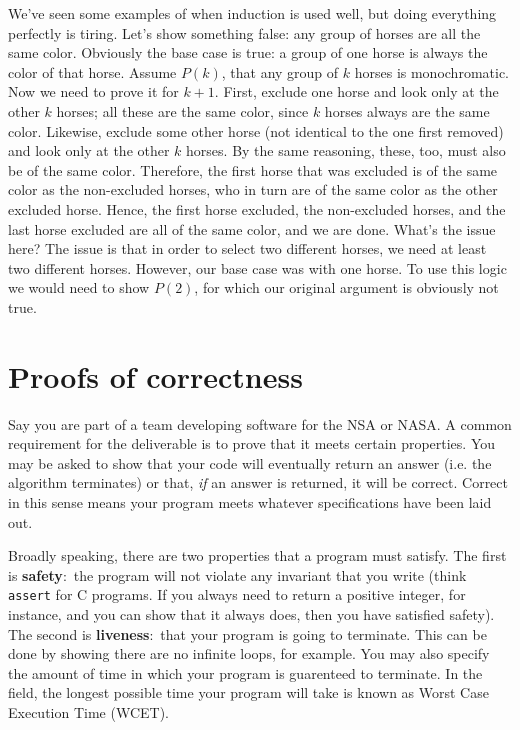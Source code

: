 \documentclass[nobib]{tufte-handout}
\newcommand{\defn}[2]{\noindent\textbf{#1}:\ #2}
\begin{document}
We've seen some examples of when induction is used well, but doing everything 
perfectly is tiring. Let's show something false: any group of horses are 
all the same color. Obviously the base case is true: a group of one horse 
is always the color of that horse. Assume $P(k)$, that any group of $k$ horses 
is monochromatic. Now we need to prove it for $k+1$. First, exclude one horse and 
look only at the other $k$ horses; all these are the same color, since $k$ horses 
always are the same color. Likewise, exclude some other horse (not identical to 
the one first removed) and look only at the other $k$ horses. By the same reasoning, 
these, too, must also be of the same color. Therefore, the first horse that 
was excluded is of the same color as the non-excluded horses, who in turn are 
of the same color as the other excluded horse. Hence, the first horse excluded, 
the non-excluded horses, and the last horse excluded are all of the same color, 
and we are done. What's the issue here? The issue is that in order to select two different 
horses, we need at least two different horses. However, our base case was with one horse. 
To use this logic we would need to show $P(2)$, for which our original argument is
obviously not true. 

\section{Proofs of correctness}

Say you are part of a team developing software for the NSA or NASA. 
A common requirement for the deliverable is to prove that it meets 
certain properties. You may be asked to show that your code 
will eventually return an answer (i.e. the algorithm terminates)
or that, \emph{if} an answer is returned, it will be correct. 
Correct in this sense means your program meets whatever specifications 
have been laid out. 

Broadly speaking, there are two properties that a program must 
satisfy. The first is 
\defn{safety}{the program will not violate any invariant that you write 
(think \texttt{assert} for C programs. If you always need to return 
a positive integer, for instance, and you can show that it always does, 
then you have satisfied safety)}. The second is 
\defn{liveness}{that your program is going to terminate}. This can be 
done by showing there are no infinite loops, for example. You may also specify
the amount of time in which your program is guarenteed to terminate. 
In the field, the longest possible time your program will take 
is known as Worst Case Execution Time (WCET).
\end{document}
